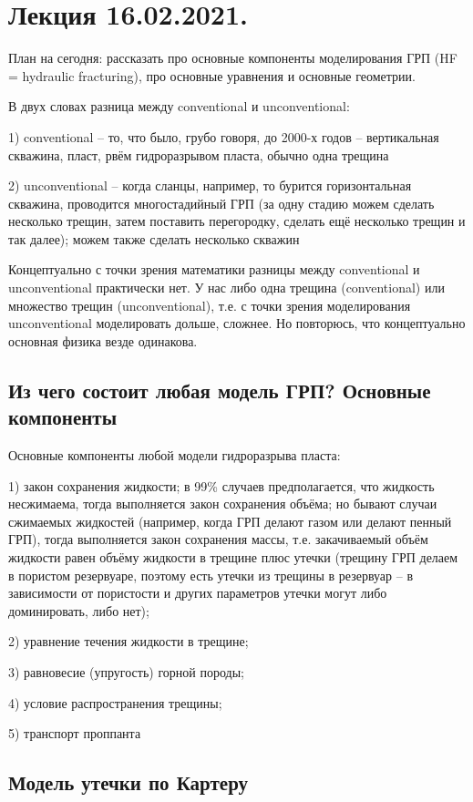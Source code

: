 \documentclass[main.tex]{subfiles}
\begin{document}

\section{Лекция 16.02.2021.}

План на сегодня: рассказать про основные компоненты моделирования ГРП (HF = hydraulic fracturing), про основные уравнения и основные геометрии.

В двух словах разница между conventional и unconventional:

1) conventional -- то, что было, грубо говоря, до 2000-х годов -- вертикальная скважина, пласт, рвём гидроразрывом пласта, обычно одна трещина

2) unconventional -- когда сланцы, например, то бурится горизонтальная скважина, проводится многостадийный ГРП (за одну стадию можем сделать несколько трещин, затем поставить перегородку, сделать ещё несколько трещин и так далее); можем также сделать несколько скважин

Концептуально с точки зрения математики разницы между conventional и unconventional практически нет.
У нас либо одна трещина (conventional) или множество трещин (unconventional), т.е. с точки зрения моделирования unconventional моделировать дольше, сложнее.
Но повторюсь, что концептуально основная физика везде одинакова.

\subsection{Из чего состоит любая модель ГРП? Основные компоненты}

Основные компоненты любой модели гидроразрыва пласта:

1) закон сохранения жидкости; в 99\% случаев предполагается, что жидкость несжимаема, тогда выполняется закон сохранения объёма; но бывают случаи сжимаемых жидкостей (например, когда ГРП делают газом или делают пенный ГРП), тогда выполняется закон сохранения массы, т.е. закачиваемый объём жидкости равен объёму жидкости в трещине плюс утечки (трещину ГРП делаем в пористом резервуаре, поэтому есть утечки из трещины в резервуар -- в зависимости от пористости и других параметров утечки могут либо доминировать, либо нет);

2) уравнение течения жидкости в трещине; 

3) равновесие (упругость) горной породы;

4) условие распространения трещины;

5) транспорт проппанта

\subsection{Модель утечки по Картеру}
\end{document}
